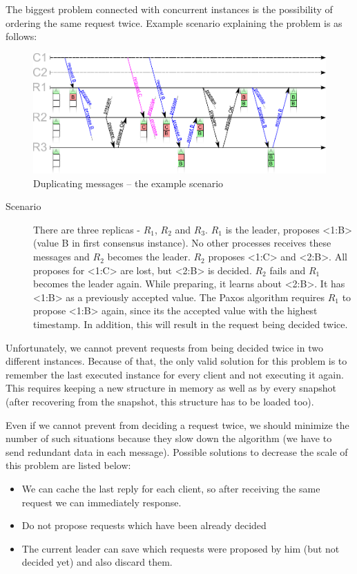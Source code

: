 The biggest problem connected with concurrent instances is the possibility of ordering the same request twice. Example scenario explaining the problem is as follows:
\begin{figure}[ht]
  \includegraphics[keepaspectratio, width=\textwidth]{paxos/duplicating_messages.pdf}
  \caption{Duplicating messages -- the example scenario}
\end{figure}
\begin{description}
  \item[Scenario] There are three replicas - $R_1$, $R_2$ and $R_3$. $R_1$ is the leader, proposes <1:B> (value B in first consensus instance). No other processes receives these messages and $R_2$ becomes the leader. $R_2$ proposes <1:C> and <2:B>. All proposes for <1:C> are lost, but <2:B> is decided. $R_2$ fails and $R_1$ becomes the leader again. While preparing, it learns about <2:B>. It has <1:B> as a previously accepted value. The Paxos algorithm requires $R_1$ to propose <1:B> again, since its the accepted value with the highest timestamp. In addition, this will result in the request being decided twice.
\end{description}

Unfortunately, we cannot prevent requests from being decided twice in two different instances. Because of that, the only valid solution for this problem is to remember the last executed instance for every client and not executing it again. This requires keeping a new structure in memory as well as by every snapshot (after recovering from the snapshot, this structure has to be loaded too).

Even if we cannot prevent from deciding a request twice, we should minimize the number of such situations because they slow down the algorithm (we have to send redundant data in each message). Possible solutions to decrease the scale of this problem are listed below:
\begin{itemize}
  \item We can cache the last reply for each client, so after receiving the same request we can immediately response.
  \item Do not propose requests which have been already decided
  \item The current leader can save which requests were proposed by him (but not decided yet) and also discard them.
\end{itemize}

